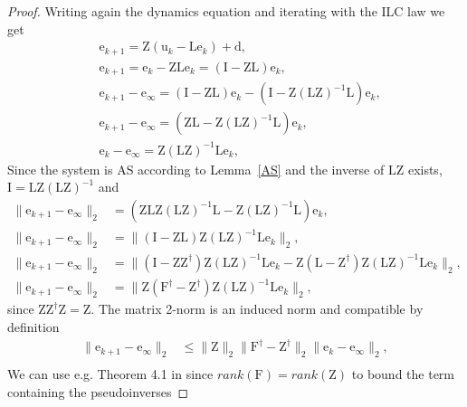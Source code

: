 \documentclass[10pt,a4paper]{article}
\theoremstyle{plain}
\theoremstyle{definition}
\newcommand{\boldvec}[1]{\boldsymbol{\mathrm{#1}}}
\let\vec\boldvec
\newcommand{\error}{\vec{e}} %
\newcommand{\linDist}{\vec{d}} %
\newcommand{\sysInput}{\vec{u}} %
\newcommand{\latentMat}{\vec{Z}} %
\newcommand{\lmatrix}{\vec{L}} %
\newcommand{\systemMat}{\vec{F}} %
\begin{document}
\begin{proof}
Writing again the dynamics equation and iterating with the ILC law we get
%
\begin{align}
&\error_{k+1} = \latentMat(\sysInput_k - \lmatrix\error_k) + \linDist, \\
&\error_{k+1} = \error_{k} - \latentMat\lmatrix\error_k = (\vec{I} - \latentMat\lmatrix)\error_k, \\
&\error_{k+1} - \error_{\infty} = (\vec{I} - \latentMat\lmatrix)\error_k - (\vec{I} - \latentMat(\lmatrix\latentMat)^{-1}\lmatrix)\error_k, \\
&\error_{k+1} - \error_{\infty} = (\latentMat\lmatrix - \latentMat(\lmatrix\latentMat)^{-1}\lmatrix)\error_k, \\
&\error_{k} - \error_{\infty} = \latentMat(\lmatrix\latentMat)^{-1}\lmatrix\error_k,
\end{align}
%
Since the system is AS according to Lemma~\ref{AS} and the inverse of $\lmatrix\latentMat$ exists, $\vec{I} = \lmatrix\latentMat(\lmatrix\latentMat)^{-1}$ and
%
\begin{align}
\|\error_{k+1} - \error_{\infty}\|_2 &= (\latentMat\lmatrix\latentMat(\lmatrix\latentMat)^{-1}\lmatrix - \latentMat(\lmatrix\latentMat)^{-1}\lmatrix)\error_k, \\
\|\error_{k+1} - \error_{\infty}\|_2 &= \|(\vec{I} - \latentMat\lmatrix)\latentMat(\lmatrix\latentMat)^{-1}\lmatrix\error_k\|_2, \\
\|\error_{k+1} - \error_{\infty}\|_2 &= \|(\vec{I} - \latentMat\latentMat^{\dagger})\latentMat(\lmatrix\latentMat)^{-1}\lmatrix\error_k - \latentMat(\lmatrix - \latentMat^{\dagger})\latentMat(\lmatrix\latentMat)^{-1}\lmatrix\error_k\|_2, \\
\|\error_{k+1} - \error_{\infty}\|_2 &= \|\latentMat(\systemMat^{\dagger} - \latentMat^{\dagger})\latentMat(\lmatrix\latentMat)^{-1}\lmatrix\error_k\|_2,
\end{align}
%
since $\latentMat\latentMat^{\dagger}\latentMat = \latentMat$. The matrix 2-norm is an induced norm and compatible by definition
%
\begin{align}
\|\error_{k+1} - \error_{\infty}\|_2 &\leq \|\latentMat\|_2\|\systemMat^{\dagger} - \latentMat^{\dagger}\|_2\|\error_{k} - \error_{\infty}\|_2,\\
\end{align}
%
We can use e.g. Theorem 4.1 in \cite{Wedin73} since $rank(\systemMat) = rank(\latentMat)$ to bound the term containing the pseudoinverses

\end{proof}
\end{document}
